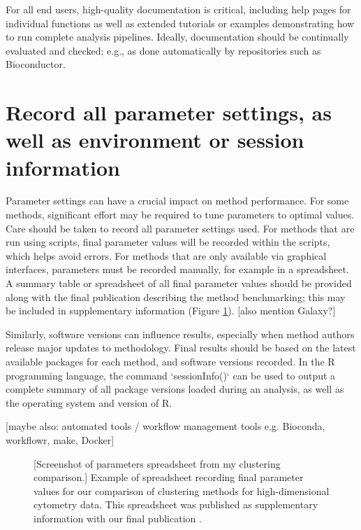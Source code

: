 \documentclass[12pt, a4paper]{article}
\begin{document}
For all end users, high-quality documentation is critical, including help pages for individual functions as well as extended tutorials or examples demonstrating how to run complete analysis pipelines. Ideally, documentation should be continually evaluated and checked; e.g., as done automatically by repositories such as Bioconductor.




\section{Record all parameter settings, as well as environment or session information}


Parameter settings can have a crucial impact on method performance. For some methods, significant effort may be required to tune parameters to optimal values. Care should be taken to record all parameter settings used. For methods that are run using scripts, final parameter values will be recorded within the scripts, which helps avoid errors. For methods that are only available via graphical interfaces, parameters must be recorded manually, for example in a spreadsheet. A summary table or spreadsheet of all final parameter values should be provided along with the final publication describing the method benchmarking; this may be included in supplementary information (Figure \ref{fig:parameters_spreadsheet}). [also mention Galaxy?]

Similarly, software versions can influence results, especially when method authors release major updates to methodology. Final results should be based on the latest available packages for each method, and software versions recorded. In the R programming language, the command `sessionInfo()` can be used to output a complete summary of all package versions loaded during an analysis, as well as the operating system and version of R.

[maybe also: automated tools / workflow management tools e.g. Bioconda, workflowr, make, Docker]



\vskip 5mm

\begin{figure}[H]
\begin{center}
\end{center}
\caption{[Screenshot of parameters spreadsheet from my clustering comparison.] Example of spreadsheet recording final parameter values for our comparison of clustering methods for high-dimensional cytometry data. This spreadsheet was published as supplementary information with our final publication \citep{Weber2016}.}
\label{fig:parameters_spreadsheet}
\end{figure}
\end{document}
